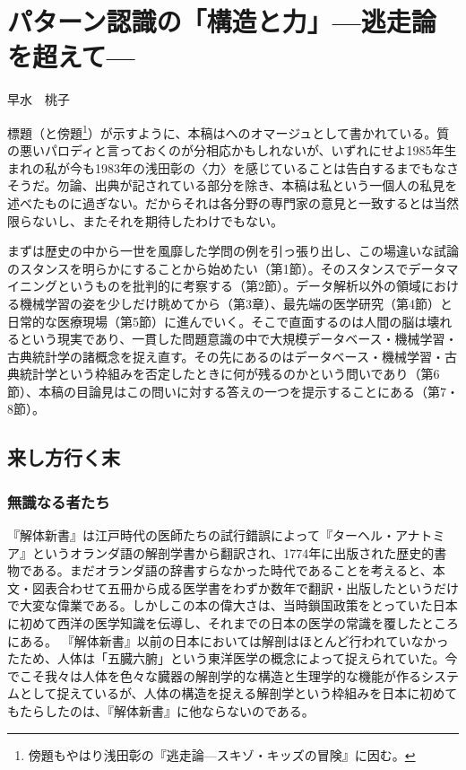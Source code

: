 
\chapter{パターン認識の「構造と力」---逃走論を超えて---}

\begin{flushright}
 早水　桃子 %
\end{flushright}

\begin{spacing}{0.6}
\noindent
{\footnotesize{標題（と傍題\footnote{傍題もやはり浅田彰の『逃走論---スキゾ・キッズの冒険』に因む。}）が示すように、本稿はへのオマージュとして書かれている。質の悪いパロディと言っておくのが分相応かもしれないが、いずれにせよ1985年生まれの私が今も1983年の浅田彰の〈力〉を感じていることは告白するまでもなさそうだ。勿論、出典が記されている部分を除き、本稿は私という一個人の私見を述べたものに過ぎない。だからそれは各分野の専門家の意見と一致するとは当然限らないし、またそれを期待したわけでもない。

\noindent
まずは歴史の中から一世を風靡した学問の例を引っ張り出し、この場違いな試論のスタンスを明らかにすることから始めたい（第1節）。そのスタンスでデータマイニングというものを批判的に考察する（第2節）。データ解析以外の領域における機械学習の姿を少しだけ眺めてから（第3章）、最先端の医学研究（第4節）と日常的な医療現場（第5節）に進んでいく。そこで直面するのは人間の脳は壊れるという現実であり、一貫した問題意識の中で大規模データベース・機械学習・古典統計学の諸概念を捉え直す。その先にあるのはデータベース・機械学習・古典統計学という枠組みを否定したときに何が残るのかという問いであり（第6節）、本稿の目論見はこの問いに対する答えの一つを提示することにある（第7・8節）。
}}
\end{spacing}
 
\section{来し方行く末}
\subsection{無識なる者たち}
『解体新書』は江戸時代の医師たちの試行錯誤によって『ターヘル・アナトミア』というオランダ語の解剖学書から翻訳され、1774年に出版された歴史的書物である。まだオランダ語の辞書すらなかった時代であることを考えると、本文・図表合わせて五冊から成る医学書をわずか数年で翻訳・出版したというだけで大変な偉業である。しかしこの本の偉大さは、当時鎖国政策をとっていた日本に初めて西洋の医学知識を伝導し、それまでの日本の医学の常識を覆したところにある。
『解体新書』以前の日本においては解剖はほとんど行われていなかったため、人体は「五臓六腑」という東洋医学の概念によって捉えられていた。今でこそ我々は人体を色々な臓器の解剖学的な構造と生理学的な機能が作るシステムとして捉えているが、人体の構造を捉える解剖学という枠組みを日本に初めてもたらしたのは、『解体新書』に他ならないのである。

